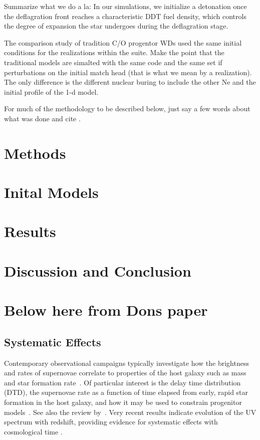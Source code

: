 \documentclass[iop,apj]{emulateapj}
\begin{document}
Summarize what we do a la:
In our simulations, we initialize a detonation once the 
deflagration front reaches a
characteristic DDT fuel density, which controls the degree of
expansion the star undergoes during the deflagration stage.

The comparison study of tradition C/O progentor WDs used the same
initial conditions for the realizations within the suite. Make the
point that the traditional models are simalted with the same code
and the same set if perturbations on the initial match head (that is
what we mean by a realization). The only difference is the different
nuclear buring to include the other Ne and the initial profile of
the 1-d model.  

For much of the methodology to be described below, just say a few
words about what was done and cite \citet{willcoxetal2016}.

\section{Methods}
\section{Inital Models}
\section{Results}
\section{Discussion and Conclusion}
\section{Below here from Dons paper}
\subsection{Systematic Effects}


Contemporary observational campaigns typically investigate how
the brightness and rates of supernovae correlate to 
properties of the host galaxy such as mass and star formation
rate~\citep[c.f.][]{graurmaoz2013,graurbiancomodjaz2015}. Of
particular interest is the delay time distribution (DTD), the
supernovae rate as a function of time elapsed from 
early, rapid
star formation in the host galaxy, and how it may be used
to constrain progenitor models~\citep{hachisu:2008,
conleyetal2011,howell2011,grauretal2011,biancoetal2011,maozmannuccibrandt2012}.
See also the review by~\citet{maozmannucci2012}.
Very recent results indicate evolution of the UV spectrum with 
redshift, providing evidence for systematic effects with
cosmological time \citep{milneandfoley2015}.
\end{document}
